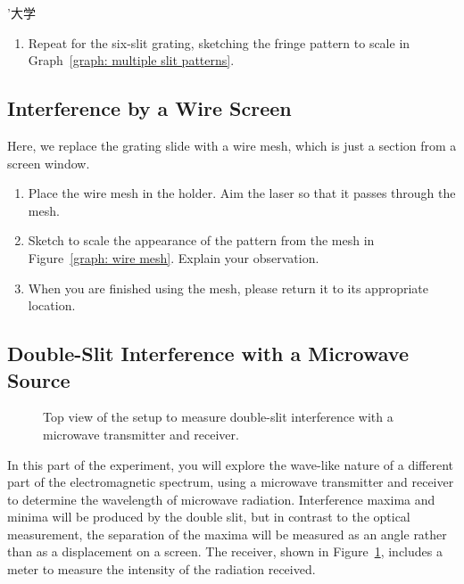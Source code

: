 ’大学\documentclass[addpoints]{physlabs}
\begin{document}
\begin{labsection}
\begin{experiment}
\begin{enumerate}
        \item Repeat for the six-slit grating, sketching the fringe pattern to scale in Graph~\ref{graph: multiple slit patterns}.
    \end{enumerate}

    \subsection*{Interference by a Wire Screen}

    Here, we replace the grating slide with a wire mesh, which is just a section from a screen window.

    \begin{enumerate}
        \item Place the wire mesh in the holder. Aim the laser so that it passes through the mesh.

        \item Sketch to scale the appearance of the pattern from the mesh in Figure~\ref{graph: wire mesh}. Explain your observation.

        \item When you are finished using the mesh, please return it to its appropriate location.
    \end{enumerate}

    \subsection*{Double-Slit Interference with a Microwave Source}

    \begin{figure}[ht]
        \centering
        
        \caption{Top view of the setup to measure double-slit interference with a microwave transmitter and receiver.}
        \label{fig: uwave double slit}
    \end{figure}

    In this part of the experiment, you will explore the wave-like nature of a different part of the electromagnetic spectrum, using a microwave transmitter and receiver to determine the wavelength of microwave radiation. Interference maxima and minima will be produced by the double slit, but in contrast to the optical measurement, the separation of the maxima will be measured as an angle rather than as a displacement on a screen. The receiver, shown in Figure~\ref{fig: uwave double slit}, includes a meter to measure the intensity of the radiation received.


\end{experiment}
\end{labsection}
\end{document}
